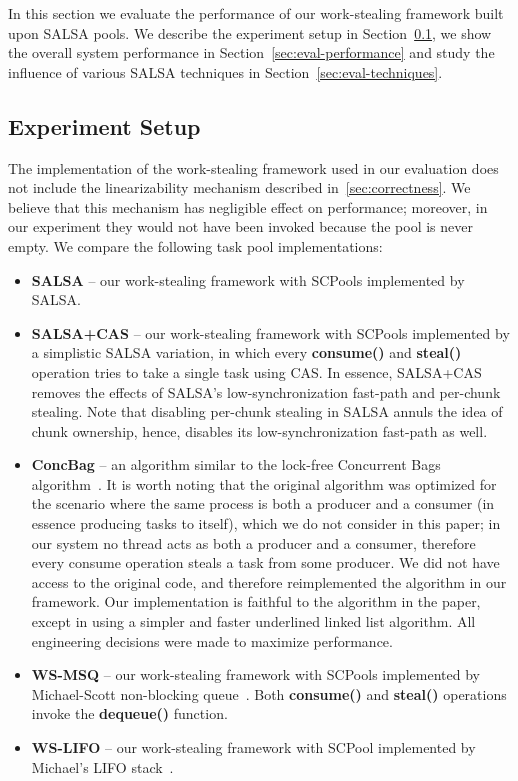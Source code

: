 In this section we evaluate the performance of our work-stealing framework built upon SALSA pools. 
We describe the experiment setup in Section~\ref{sec:exp-setup}, we show the overall system performance in Section~\ref{sec:eval-performance} and study the influence of various SALSA techniques in Section~\ref{sec:eval-techniques}.

\subsection {Experiment Setup}
\label{sec:exp-setup}
The implementation of the work-stealing framework used in our evaluation does not include the linearizability mechanism described in~\ref{sec:correctness}. We believe that this mechanism has negligible effect on performance; moreover, in our experiment they would not have been invoked because the pool is never empty. We compare the following task pool implementations:
\begin {itemize}
\item
{\bf SALSA} -- our work-stealing framework with SCPools implemented by SALSA.
\item
{\bf SALSA+CAS} -- our work-stealing framework with SCPools implemented by a simplistic SALSA variation, in which every {\bf consume()} and {\bf steal()} operation tries to take a single task using CAS. In essence, SALSA+CAS removes the effects of SALSA's low-synchronization fast-path and per-chunk stealing. 
Note that disabling per-chunk stealing in SALSA annuls the idea of chunk ownership, hence, disables its low-synchronization fast-path as well. 
\item
{\bf ConcBag} -- an algorithm similar to the lock-free Concurrent Bags algorithm~\cite{Sundell:2011:LAC:1989493.1989550}. 
It is worth noting that the original algorithm was optimized for the scenario where the same process is both a producer and a consumer (in essence producing tasks to itself), which we do not consider in this paper; in our system no thread acts as both a producer and a consumer, therefore every consume operation steals a task from some producer.
We did not have access to the original code, and therefore reimplemented the algorithm in our framework. Our implementation is faithful to the algorithm in the paper, except in using a simpler and faster underlined linked list algorithm. All engineering decisions were made to maximize performance. 
\item
{\bf WS-MSQ} -- our work-stealing framework with SCPools implemented by Michael-Scott non-blocking queue~\cite{Michael:1996:SFP:248052.248106}. Both {\bf consume()} and {\bf steal()} operations invoke the {\bf dequeue()} function. 
\item
{\bf WS-LIFO} -- our work-stealing framework with SCPool implemented by Michael's LIFO stack~\cite{Michael:2004:HPS:987524.987595}. 
\end {itemize} 

